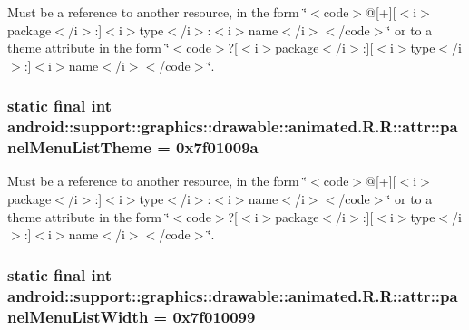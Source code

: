 Must be a reference to another resource, in the form \char`\"{}$<$code$>$@\mbox{[}+\mbox{]}\mbox{[}$<$i$>$package$<$/i$>$:\mbox{]}$<$i$>$type$<$/i$>$:$<$i$>$name$<$/i$>$$<$/code$>$\char`\"{} or to a theme attribute in the form \char`\"{}$<$code$>$?\mbox{[}$<$i$>$package$<$/i$>$:\mbox{]}\mbox{[}$<$i$>$type$<$/i$>$:\mbox{]}$<$i$>$name$<$/i$>$$<$/code$>$\char`\"{}. \hypertarget{classandroid_1_1support_1_1graphics_1_1drawable_1_1animated_1_1_r_1_1attr_624b27899585734a5c78a749908627ca}{
\subsubsection[{panelMenuListTheme}]{\setlength{\rightskip}{0pt plus 5cm}static final int android::support::graphics::drawable::animated.R.R::attr::panelMenuListTheme = 0x7f01009a}}
\label{classandroid_1_1support_1_1graphics_1_1drawable_1_1animated_1_1_r_1_1attr_624b27899585734a5c78a749908627ca}


Must be a reference to another resource, in the form \char`\"{}$<$code$>$@\mbox{[}+\mbox{]}\mbox{[}$<$i$>$package$<$/i$>$:\mbox{]}$<$i$>$type$<$/i$>$:$<$i$>$name$<$/i$>$$<$/code$>$\char`\"{} or to a theme attribute in the form \char`\"{}$<$code$>$?\mbox{[}$<$i$>$package$<$/i$>$:\mbox{]}\mbox{[}$<$i$>$type$<$/i$>$:\mbox{]}$<$i$>$name$<$/i$>$$<$/code$>$\char`\"{}. \hypertarget{classandroid_1_1support_1_1graphics_1_1drawable_1_1animated_1_1_r_1_1attr_6cc49c0df5a86ebc36180a2e0bac430a}{
\subsubsection[{panelMenuListWidth}]{\setlength{\rightskip}{0pt plus 5cm}static final int android::support::graphics::drawable::animated.R.R::attr::panelMenuListWidth = 0x7f010099}}
\label{classandroid_1_1support_1_1graphics_1_1drawable_1_1animated_1_1_r_1_1attr_6cc49c0df5a86ebc36180a2e0bac430a}


